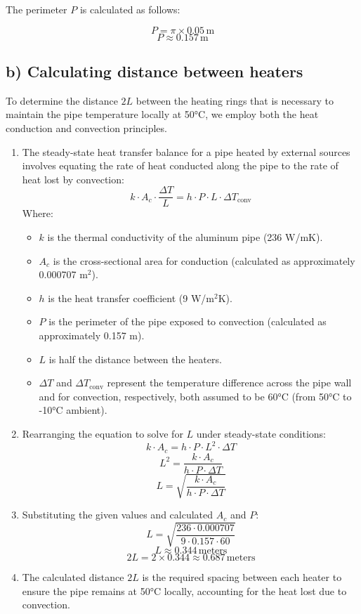 \documentclass{article}
\begin{document}
The perimeter \(P\) is calculated as follows:

    \[
    P = \pi \times 0.05 \, \text{m}
    \]
    \[
    P \approx 0.157 \, \text{m}
    \]
\subsection*{b) Calculating distance between heaters}

To determine the distance \(2L\) between the heating rings that is necessary to maintain the pipe temperature locally at 50°C, we employ both the heat conduction and convection principles.

\begin{enumerate}
    \item The steady-state heat transfer balance for a pipe heated by external sources involves equating the rate of heat conducted along the pipe to the rate of heat lost by convection:
    \[
    k \cdot A_c \cdot \frac{\Delta T}{L} = h \cdot P \cdot L \cdot \Delta T_{\text{conv}}
    \]
    Where:
    \begin{itemize}
        \item \(k\) is the thermal conductivity of the aluminum pipe (236 W/mK).
        \item \(A_c\) is the cross-sectional area for conduction (calculated as approximately 0.000707 m\(^2\)).
        \item \(h\) is the heat transfer coefficient (9 W/m\(^2\)K).
        \item \(P\) is the perimeter of the pipe exposed to convection (calculated as approximately 0.157 m).
        \item \(L\) is half the distance between the heaters.
        \item \(\Delta T\) and \(\Delta T_{\text{conv}}\) represent the temperature difference across the pipe wall and for convection, respectively, both assumed to be 60°C (from 50°C to -10°C ambient).
    \end{itemize}

    \item Rearranging the equation to solve for \(L\) under steady-state conditions:
    \[
    k \cdot A_c = h \cdot P \cdot L^2 \cdot \Delta T
    \]
    \[
    L^2 = \frac{k \cdot A_c}{h \cdot P \cdot \Delta T}
    \]
    \[
    L = \sqrt{\frac{k \cdot A_c}{h \cdot P \cdot \Delta T}}
    \]

    \item Substituting the given values and calculated \(A_c\) and \(P\):
    \[
    L = \sqrt{\frac{236 \cdot 0.000707}{9 \cdot 0.157 \cdot 60}}
    \]
    \[
    L \approx 0.344 \, \text{meters}
    \]
    \[
    2L = 2 \times 0.344 \approx 0.687 \, \text{meters}
    \]

    \item The calculated distance \(2L\) is the required spacing between each heater to ensure the pipe remains at 50°C locally, accounting for the heat lost due to convection.
\end{enumerate}
\end{document}
